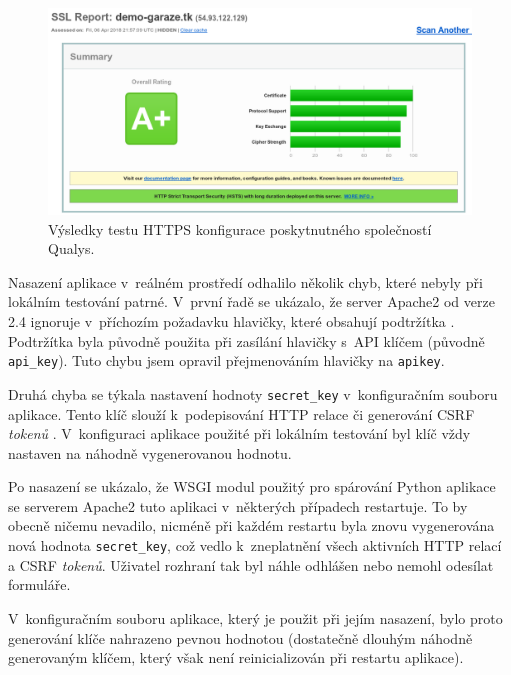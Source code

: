 \begin{figure}[h!]
    \centering
    \includegraphics[width=\textwidth]{images/ssl_test.png}
    \caption[Výsledky testu HTTPS konfigurace]{Výsledky testu HTTPS konfigurace poskytnutného společností Qualys.}
    \label{fig:ssl_test}
\end{figure}

Nasazení aplikace v~reálném prostředí odhalilo několik chyb, které nebyly při lokálním testování patrné. V~první řadě se ukázalo, že server Apache2 od verze 2.4 ignoruje v~příchozím požadavku hlavičky, které obsahují podtržítka \cite{apache_headers_update}. Podtržítka byla původně použita při zasílání hlavičky s~API klíčem (původně \texttt{api\_key}). Tuto chybu jsem opravil přejmenováním hlavičky na \texttt{apikey}.

Druhá chyba se týkala nastavení hodnoty \texttt{secret\_key} v~konfiguračním souboru aplikace. Tento klíč slouží k~podepisování HTTP relace či generování CSRF \textit{tokenů} \cite{flask_api}. V~konfiguraci aplikace použité při lokálním testování byl klíč vždy nastaven na náhodně vygenerovanou hodnotu.

Po nasazení se ukázalo, že WSGI \cite{python_wsgi} modul použitý pro spárování Python aplikace se serverem Apache2 tuto aplikaci v~některých případech restartuje. To by obecně ničemu nevadilo, nicméně při každém restartu byla znovu vygenerována nová hodnota \texttt{secret\_key}, což vedlo k~zneplatnění všech aktivních HTTP relací a CSRF \textit{tokenů}. Uživatel rozhraní tak byl náhle odhlášen nebo nemohl odesílat formuláře. 

V~konfiguračním souboru aplikace, který je použit při jejím nasazení, bylo proto generování klíče nahrazeno pevnou hodnotou (dostatečně dlouhým náhodně generovaným klíčem, který však není reinicializován při restartu aplikace).

